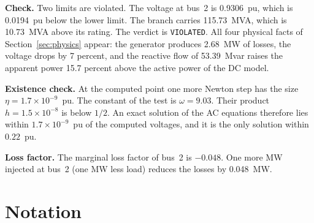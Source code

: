 \documentclass[a4paper,11pt]{article}
\begin{document}
\textbf{Check.} Two limits are violated. The voltage at bus~2 is 0.9306~pu, which is 0.0194~pu below the lower limit. The branch carries 115.73~MVA, which is 10.73~MVA above its rating. The verdict is \texttt{VIOLATED}. All four physical facts of Section~\ref{sec:physics} appear: the generator produces 2.68~MW of losses, the voltage drops by 7 percent, and the reactive flow of 53.39~Mvar raises the apparent power 15.7 percent above the active power of the DC model.

\textbf{Existence check.} At the computed point one more Newton step has the size $\eta=1.7\times10^{-9}$~pu. The constant of the test is $\omega=9.03$. Their product $h=1.5\times10^{-8}$ is below $1/2$. An exact solution of the AC equations therefore lies within $1.7\times10^{-9}$~pu of the computed voltages, and it is the only solution within $0.22$~pu.

\textbf{Loss factor.} The marginal loss factor of bus~2 is $-0.048$. One more MW injected at bus~2 (one MW less load) reduces the losses by 0.048~MW.

\section{Notation}\label{sec:notation-alg}
\end{document}
